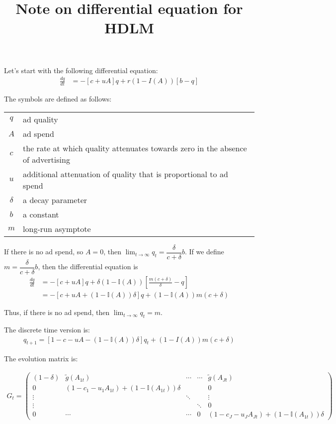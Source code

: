 \documentclass[letter,11pt]{article}
\title{Note on differential equation for HDLM}
\newcommand{\Igtz}{\mathbb{I}}
\begin{document}
\maketitle

Let's start with the following differential equation:
\begin{align}
  \label{eq:de1}
  \frac{dq}{dt}&=-\left[c+uA\right]q+r(1-I(A))\left[b-q\right]
\end{align}

The symbols are defined as follows:

\begin{table}[h]\centering
\begin{tabular}[h]{cl}
  $q$&ad quality\\
$A$&ad spend\\
$c$&the rate at which quality attenuates towards zero in the absence of
   advertising\\
$u$&additional attenuation of quality that is proportional to ad
     spend\\
$\delta$&a decay parameter\\
$b$&a constant\\
$m$&long-run asymptote
\end{tabular}
\end{table}

If there is no ad spend, so $A=0$, then
$\lim_{t\to\infty}q_t=\dfrac{\delta}{c+\delta}b$.  If we define
$m=\dfrac{\delta}{c+\delta}b$, then the differential equation is
\begin{align}
  \label{eq:de2}
  \frac{dq}{dt}&=-\left[c+uA\right]q+\delta(1-\Igtz(A))\left[\frac{m(c+\delta)}{\delta}-q\right]\\
&=-\left[c+uA+\left(1-\Igtz(A)\right)\delta\right]q+(1-\Igtz(A))m(c+\delta)
\end{align}

Thus, if there is no ad spend, then $\lim_{t\to\infty}q_t=m$.

The discrete time version is:
\begin{align}
  \label{eq:de3}
  q_{t+1}=\left[1-c-uA-\left(1-\Igtz(A)\right)\delta\right]q_t+(1-I(A))m(c+\delta)
\end{align}

The evolution matrix is:

\begin{align}
  \label{eq:Gt}
  G_t=\begin{pmatrix}
(1-\delta)&\tilde{g}(A_{1t})&\cdots&\cdots&\tilde{g}(A_{Jt})\\
0&(1-c_1-u_1A_{1t}) +(1-\Igtz(A_{1t}))\delta&&&0\\
\vdots&&\ddots&&\vdots\\
\vdots&&&\ddots&0\\
0&\cdots&\cdots&0&(1-c_J-u_JA_{Jt}) +(1-\Igtz(A_{1t}))\delta
\end{pmatrix}
\end{align}
\end{document}
